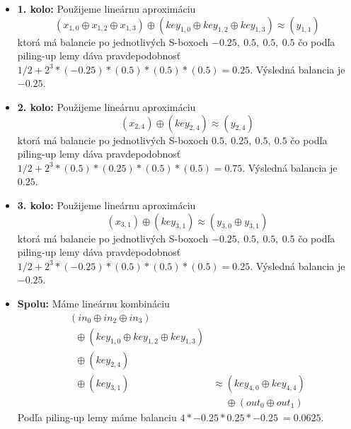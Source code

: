\begin{itemize}
\item {\bf 1. kolo:}
Použijeme lineárnu aproximáciu
\begin{equation*}
( x_{1,0} \oplus x_{1,2} \oplus x_{1,3}  ) 
 \oplus ( key_{1,0} \oplus key_{1,2} \oplus key_{1,3} ) 
 \approx ( y_{1,1} )
\end{equation*}
ktorá má balancie po jednotlivých S-boxoch $
-0.25,\ 0.5,\ 0.5,\ 0.5
$ čo podľa piling-up lemy dáva pravdepodobnosť 
$1/2 + 2^3*( -0.25)*(0.5)*(0.5)*(0.5 )= 0.25 $. 
Výsledná balancia je $-0.25$.

\item {\bf 2. kolo:}
Použijeme lineárnu aproximáciu
\begin{equation*}
( x_{2,4}  ) 
 \oplus ( key_{2,4} ) 
 \approx ( y_{2,4} )
\end{equation*}
ktorá má balancie po jednotlivých S-boxoch $
0.5,\ 0.25,\ 0.5,\ 0.5
$ čo podľa piling-up lemy dáva pravdepodobnosť 
$1/2 + 2^3*( 0.5)*(0.25)*(0.5)*(0.5 )= 0.75 $. 
Výsledná balancia je $0.25$.

\item {\bf 3. kolo:}
Použijeme lineárnu aproximáciu
\begin{equation*}
( x_{3,1}  ) 
 \oplus ( key_{3,1} ) 
 \approx ( y_{3,0} \oplus y_{3,1} )
\end{equation*}
ktorá má balancie po jednotlivých S-boxoch $
-0.25,\ 0.5,\ 0.5,\ 0.5
$ čo podľa piling-up lemy dáva pravdepodobnosť 
$1/2 + 2^3*( -0.25)*(0.5)*(0.5)*(0.5 )= 0.25 $. 
Výsledná balancia je $-0.25$.

\item {\bf Spolu:}  Máme lineárnu kombináciu 
\begin{equation*}
\begin{split}
( in_{0} \oplus in_{2} \oplus in_{3} )
 & \\
 \phantom{x} \oplus ( key_{1,0} \oplus key_{1,2} \oplus key_{1,3} )
 & \\
 \phantom{x} \oplus ( key_{2,4} )
 & \\
 \phantom{x} \oplus ( key_{3,1} )
 & \approx  (
key_{4,0} \oplus key_{4,4}
 ) \\
 & \phantom{\approx} \oplus (
out_{0} \oplus out_{1}
) \end{split}
\end{equation*}
Podľa piling-up lemy máme balanciu $4* -0.25*0.25*-0.25 ~= 0.0625 $.
\end{itemize}
